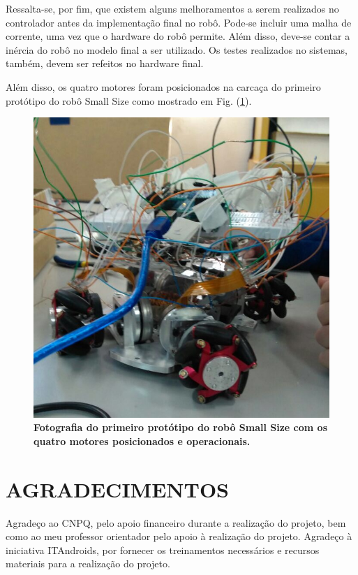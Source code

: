 \documentclass[10pt,fleqn,a4paper]{article}
\begin{document}
    Ressalta-se, por fim, que existem alguns melhoramentos a serem realizados no controlador antes da implementação final no robô. Pode-se incluir uma malha de corrente, uma vez que o hardware do robô permite. Além disso, deve-se contar a inércia do robô no modelo final a ser utilizado. Os testes realizados no sistemas, também, devem ser refeitos no hardware final.
    
    Além disso, os quatro motores foram posicionados na carcaça do primeiro protótipo do robô Small Size como mostrado em Fig. (\ref{fig:smallfoto}).

	\begin{figure}[ht]
		\begin{center}
			\includegraphics[angle=0, scale=0.3]{images/smallfoto}
		\end{center}
		\caption{\textbf{Fotografia do primeiro protótipo do robô Small Size com os quatro motores posicionados e operacionais.}}
		\label{fig:smallfoto}
	\end{figure}

	\section{AGRADECIMENTOS}
	
	Agradeço ao CNPQ, pelo apoio financeiro durante a realização do projeto, bem como ao meu professor orientador pelo apoio à realização do projeto. Agradeço à iniciativa ITAndroids, por fornecer os treinamentos necessários e recursos materiais para a realização do projeto.
	
\end{document}
